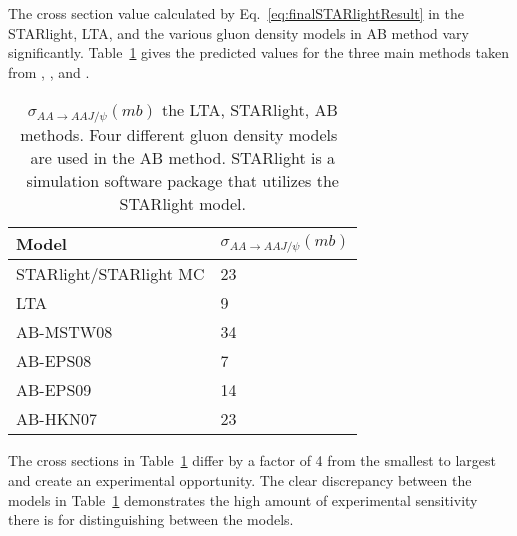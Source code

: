   The cross section value calculated by Eq.~\ref{eq:finalSTARlightResult} in the 
    STARlight, LTA, and the various gluon density models in AB method vary 
    significantly.
  Table~\ref{tab:allXsec} gives the predicted values for the three main methods
    taken from \cite{pQCD2013.02}, \cite{lta2011.09}, and \cite{vmd1999}.
  \begin{table} 
   \centering
   \begin{tabular}{|l|l|} 
     \hline
     Model & $\sigma_{AA\rightarrow AAJ/\psi} (mb)$ \\ \hline \hline
     STARlight/STARlight MC & 23 \\ \hline
     LTA & 9 \\ \hline
     AB-MSTW08 & 34 \\ \hline
     AB-EPS08 & 7  \\ \hline
     AB-EPS09 & 14 \\ \hline
     AB-HKN07 & 23 \\ \hline
     \hline
   \end{tabular}
   \caption{$\sigma_{AA\rightarrow AAJ/\psi} (mb)$
    the LTA, STARlight, AB methods. Four different gluon density models~\cite{pQCD2011.08,pQCD2013.02,Pumplin:2002vw} are used 
    in the AB method. STARlight is a simulation software package that utilizes 
    the STARlight model.}
   \label{tab:allXsec}
  \end{table}
  The cross sections in Table~\ref{tab:allXsec} differ by a factor of 4 
    from the smallest to largest and create an experimental opportunity. 
  The clear discrepancy between the models in Table~\ref{tab:allXsec} 
    demonstrates the high amount of experimental sensitivity there is for 
    distinguishing between the models. 

